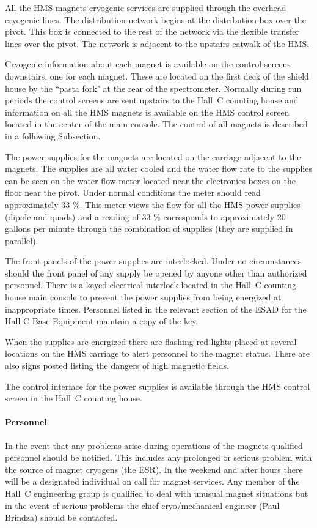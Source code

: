 All the HMS magnets cryogenic services are supplied through the overhead
cryogenic lines. The distribution network begins at the distribution
box over the pivot. This box is connected to the rest of the network via the
flexible transfer lines over the pivot. The network is adjacent to
the upstairs catwalk of the HMS.

Cryogenic information about each magnet is available on the control screens
downstairs, one for each magnet. These are located on the first deck
of the shield house by the ``pasta fork" at the rear of the spectrometer.
Normally during run periods the control screens are sent upstairs to the
Hall~C counting house and information on all the HMS magnets is available
on the HMS control screen located in the center of the main console.
The control of all magnets is described in a following Subsection.

The power supplies for the magnets are located on the carriage
adjacent to the magnets. The supplies are all water cooled and
the water flow rate to the supplies can be seen on the water flow
meter located near the electronics boxes on the floor near the pivot.
Under normal conditions the meter should read
approximately 33 $\%$. This meter views the flow for all the HMS power supplies
(dipole and quads) and a reading of 33 $\%$ corresponds to approximately
20 gallons per minute through the combination of supplies (they are supplied
in parallel).

The front panels of the power supplies are interlocked. Under
no circumstances should the front panel of any supply be opened by anyone other
than authorized personnel. There is a keyed electrical interlock
located in the Hall~C counting house main console to prevent the
power supplies from being energized at inappropriate times.
Personnel listed in the relevant section of the ESAD for the Hall C
Base Equipment maintain a copy
of the key.

When the supplies are energized there are flashing red lights placed at
several locations on the HMS carriage to alert personnel to the magnet
status. There are also signs posted listing the dangers of high magnetic
fields.

The control interface for the power supplies is available through the HMS
control screen in the Hall~C counting house.

\paragraph{Personnel}
In the event that any problems arise during operations of the magnets
qualified personnel should be notified. This includes any prolonged
or serious problem with the source of magnet cryogens (the ESR).
In the weekend and after hours there
will be a designated individual on call for magnet services. Any member of
the Hall~C engineering group is qualified to deal with unusual magnet situations
but in the event of serious problems the chief cryo/mechanical engineer (Paul
Brindza) should be contacted.


